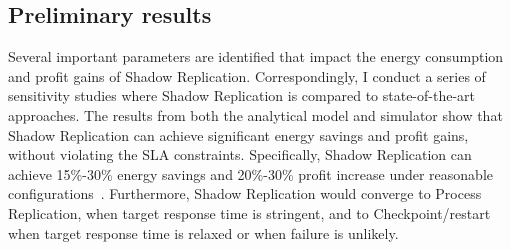 \subsection{Preliminary results}
Several important parameters are identified that impact the energy consumption and profit gains of Shadow Replication. Correspondingly, I conduct a series of sensitivity studies where Shadow Replication is compared to state-of-the-art approaches. %
The results from both the analytical model and simulator show that Shadow Replication can achieve significant energy savings and profit gains, without violating the SLA constraints. %
Specifically, Shadow Replication can achieve 15\%-30\% energy savings and 20\%-30\% profit increase under reasonable configurations~\cite{cui_closer_2014}. Furthermore, Shadow Replication would converge to Process Replication, when target response time is stringent, and to Checkpoint/restart when target response time is relaxed or when failure is unlikely.



